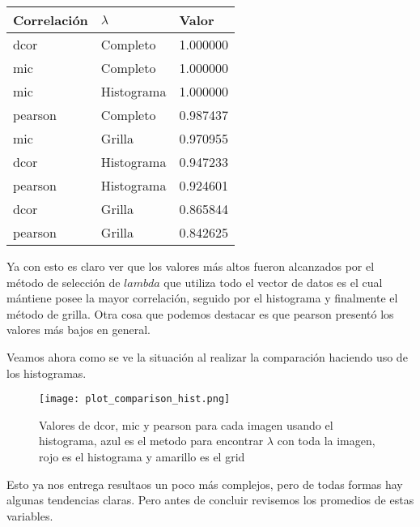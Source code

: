     \begin{table}[H]
        \centering
        \begin{tabular}{|l|l|l|}
            \hline
        Correlaci\'on    & $\lambda$ & Valor  \\    \hline
        dcor    & Completo & 1.000000  \\
        mic     & Completo & 1.000000  \\
        mic     & Histograma & 1.000000  \\
        pearson & Completo & 0.987437  \\
        mic     & Grilla & 0.970955  \\
        dcor    & Histograma & 0.947233  \\
        pearson & Histograma & 0.924601  \\
        dcor    & Grilla & 0.865844  \\
        pearson & Grilla & 0.842625  \\     \hline

        \end{tabular}
    \end{table}

    Ya con esto es claro ver que los valores m\'as altos fueron alcanzados por el m\'etodo de selecci\'on de $lambda$ que utiliza todo el vector de datos es el cual m\'antiene posee la mayor correlaci\'on, seguido por el histograma y finalmente el m\'etodo de grilla. Otra cosa que podemos destacar es que pearson present\'o los valores m\'as bajos en general.

    Veamos ahora como se ve la situaci\'on al realizar la comparaci\'on haciendo uso de los histogramas.

    \begin{figure}[H]
        \centering
        \texttt{[image: plot\_comparison\_hist.png]}
        \caption{Valores de dcor, mic y pearson para cada imagen usando el histograma, azul es el metodo para encontrar $\lambda$ con toda la imagen, rojo es el histograma y amarillo es el grid}
    \end{figure}

    Esto ya nos entrega resultaos un poco m\'as complejos, pero de todas formas hay algunas tendencias claras. Pero antes de concluir revisemos los promedios de estas variables.

